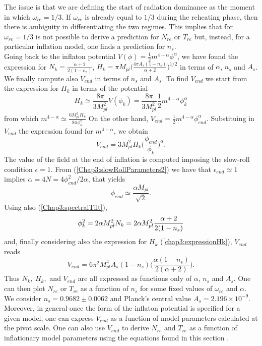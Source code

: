 \documentclass[11pt,a4paper,twoside]{book}
\begin{document}
The issue is that we are defining the start of radiation dominance as the moment in which $\omega_{re}=1/3$. If $\omega_{re}$ is already equal to $ 1/3 $ during the reheating phase, then there is ambiguity in differentiating the two regimes. This implies that for $\omega_{re}=1/3$ is not possible to derive a prediction for $ N_{re} $ or $ T_{re} $ but, instead, for a particular inflation model, one finds a prediction for $ n_{s} $.\\
Going back to the inflaton potential $ V(\phi)=\frac{1}{2}m^{4-\alpha}\phi^{\alpha} $, we have found the expression for $ N_{k}=\frac{\alpha + 2 }{2(1-n_{s})} $, $ H_{k}=\pi M_{pl}\big(\frac{4\pi A_{s}(1-n_{s})}{\alpha +2}\big)^{1/2} $ in terms of $\alpha$, $ n_{s} $ and $ A_{s} $.\\
 We finally compute also $ V_{end} $ in terms of $ n_{s} $ and $ A_{s} $. To find $ V_{end} $ we start from the expression for $ H_{k} $ in terms of the potential
 \begin{equation}
\label{Chap3:HubblekPotential}
H_{k}\simeq  \frac{8\pi}{3M_{pl}^{2}}V(\phi_{k})= \frac{8\pi}{3M_{pl}^{2}}\frac{1}{2}m^{4-\alpha}\phi_{k}^{\alpha}
 \end{equation}
from which $ m^{4-\alpha} \simeq \frac{6M_{pl}^{2}H_{k}}{8\pi \phi_{k}^{\alpha}} $
On the other hand, $ V_{end}=\frac{1}{2}m^{4-\alpha}\phi_{end}^{\alpha} $. Substituing in $ V_{end} $ the expression found for $ m^{4-\alpha} $, we obtain
\begin{equation}
	\label{Chap3:Vend}
	V_{end}=3M_{pl}^{2}H_{k}\Big(\frac{\phi_{end}}{\phi_{k}}\Big)^{\alpha}.
\end{equation}
The value of the field at the end of inflation is computed imposing the slow-roll condition $\epsilon = 1$. From (\ref{Chap3:slowRollParameters2}) we have that $\epsilon_{end}\simeq 1$ implies $\alpha = 4N= 4 \phi^{2}_{end}/2\alpha$, that yields
\begin{equation}
	\label{Chap3:phiEnd}
\phi_{end}\simeq\frac{\alpha M_{pl}}{\sqrt{2}}.
\end{equation}
Using also (\ref{Chap3:spectralTilt}),
\begin{equation}
\label{Chap3:expressionN_{k}}
\phi_{k}^{2}=2\alpha M_{pl}^{2}N_{k}=2\alpha M_{pl}^{2}\frac{\alpha + 2}{2(1-n_{s})}
\end{equation}
and, finally considering also the expression for $ H_{k} $ (\ref{chap3:expressionHk}), $ V_{end} $ reads
\begin{equation}
\label{Chap3:Vend2}
V_{end}=6\pi^{2}M_{pl}^{4}A_{s}(1-n_{s})\Bigg(\frac{\alpha(1-n_{s})}{2(\alpha+2)}\Bigg).
\end{equation}
Thus $ N_{k},\ H_{k},$ and $ V_{end} $ are all expressed as functions only of $ \alpha $, $ n_{s} $ and $ A_{s} $. One can then plot $ N_{re} $ or $ T_{re} $ as a function of $ n_{s} $ for some fixed values of $ \omega_{re} $ and $ \alpha $. We consider $ n_{s}=0.9682 \pm 0.0062 $ and Planck's central value $ A_{s}=2.196\times 10^{-9} $. Moreover, in general once the form of the inflaton potential is specified for a given model, one can express $ V_{end} $ as a function of model parameters calculated at the pivot scale. One can also use $ V_{end} $ to derive $ N_{re} $ and $ T_{re} $ as a function of inflationary model parameters using the equations found in this section \cite{Chap3:Cook}.
\end{document}
